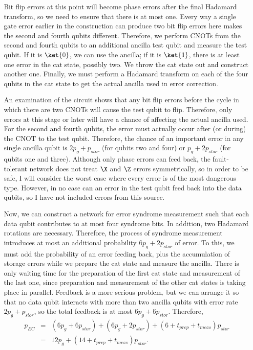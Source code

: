 Bit flip errors at this point will become phase errors after the final
Hadamard transform, so we need to ensure that there is at most one.
Every way a single gate error earlier in the construction can produce two
bit flip errors here makes the second and fourth qubits different.
Therefore, we perform CNOTs from the second and fourth qubits to an
additional ancilla test qubit and measure the test qubit.  If it is $\ket{0}$,
we can use the ancilla; if it is $\ket{1}$, there is at least one error in the
cat state, possibly two.  We throw the cat state out and construct another
one.  Finally, we must perform a Hadamard transform on each of the four
qubits in the cat state to get the actual ancilla used in error correction.

An examination of the circuit shows that any bit flip errors before the
cycle in which there are two CNOTs will cause the test qubit to flip.
Therefore, only errors at this stage or later will have a chance of affecting
the actual ancilla used.  For the second and fourth qubits, the error must
actually occur after (or during) the CNOT to the test qubit.  Therefore, the
chance of an important error in any single ancilla qubit is $2 p_g +
p_{stor}$ (for qubits two and four) or $p_g + 2p_{stor}$ (for qubits one and
three).  Although only phase errors can feed back, the fault-tolerant network
does not treat $\X$ and $\Z$ errors symmetrically, so in order to be safe, I
will consider the worst case where every error is of the most  dangerous type.
However, in no case can an error in the test qubit feed back into the data
qubits, so I have not included errors from this source.

Now, we can construct a network for error syndrome measurement such
that each data qubit contributes to at most four syndrome bits.  In
addition, two Hadamard rotations are necessary.  Therefore, the process of
syndrome measurement introduces at most an additional probability $6
p_g + 2 p_{stor}$ of error.  To this, we must add the probability of an error
feeding back, plus the accumulation of storage errors while we prepare the
cat state and measure the ancilla.  There is only waiting time for the
preparation of the first cat state and measurement of the last one, since
preparation and measurement of the other cat states is taking place in
parallel.  Feedback is a more serious problem, but we can arrange it so
that no data qubit interacts with more than two ancilla qubits with error
rate $2p_g + p_{stor}$, so the total feedback is at most $6 p_g + 6 p_{stor}$.
Therefore,
\begin{eqnarray}
	p_{EC} &  = & (6 p_g + 6 p_{stor}) + (6 p_g + 2 p_{stor}) +
	(6 + t_{prep} + t_{meas}) p_{stor} \\
	&  = &  12 p_g + (14 + t_{prep} + t_{meas}) p_{stor}.
\end{eqnarray}


